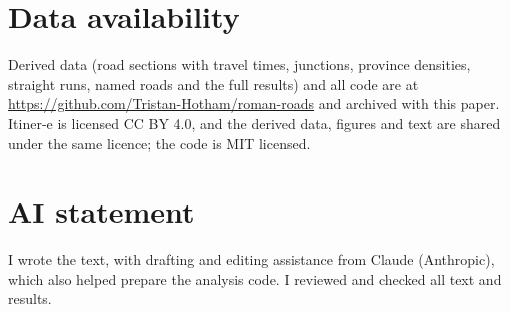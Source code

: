\documentclass[11pt,a4paper]{article}
\begin{document}
\section*{Data availability}
Derived data (road sections with travel times, junctions, province densities, straight runs, named roads and the full results) and all code are at \url{https://github.com/Tristan-Hotham/roman-roads} and archived with this paper. Itiner-e is licensed CC BY 4.0, and the derived data, figures and text are shared under the same licence; the code is MIT licensed.

\section*{AI statement}
I wrote the text, with drafting and editing assistance from Claude (Anthropic), which also helped prepare the analysis code. I reviewed and checked all text and results.
\end{document}
